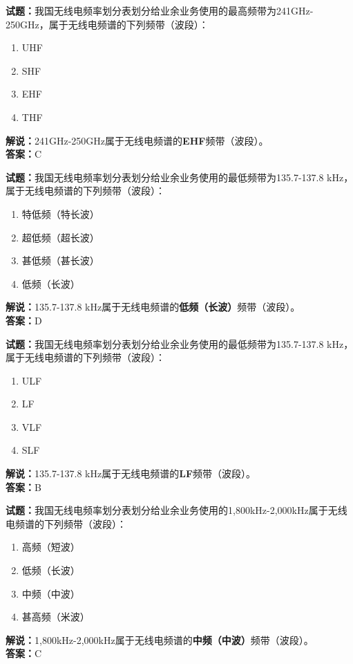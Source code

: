 \documentclass{ctexbook}
\begin{document}
\vspace{1em}

\textbf{试题：}我国无线电频率划分表划分给业余业务使用的最高频带为241\unit{\GHz}-250\unit{\GHz}，属于无线电频谱的下列频带（波段）：
\begin{enumerate}[leftmargin=3em]
  \item UHF
  \item SHF
  \item EHF
  \item THF
\end{enumerate}
\noindent\textbf{解说：}241\unit{\GHz}-250\unit{\GHz}属于无线电频谱的\textbf{EHF}频带（波段）。\\\noindent\textbf{答案：}C

\vspace{1em}

\textbf{试题：}我国无线电频率划分表划分给业余业务使用的最低频带为135.7-137.8 \unit{\kHz}，属于无线电频谱的下列频带（波段）：
\begin{enumerate}[leftmargin=3em]
  \item 特低频（特长波）
  \item 超低频（超长波）
  \item 甚低频（甚长波）
  \item 低频（长波）
\end{enumerate}
\noindent\textbf{解说：}135.7-137.8 \unit{\kHz}属于无线电频谱的\textbf{低频（长波）}频带（波段）。\\\noindent\textbf{答案：}D

\vspace{1em}

\textbf{试题：}我国无线电频率划分表划分给业余业务使用的最低频带为135.7-137.8 \unit{\kHz}，属于无线电频谱的下列频带（波段）：
\begin{enumerate}[leftmargin=3em]
  \item ULF
  \item LF
  \item VLF
  \item SLF
\end{enumerate}
\noindent\textbf{解说：}135.7-137.8 \unit{\kHz}属于无线电频谱的\textbf{LF}频带（波段）。\\\noindent\textbf{答案：}B

\vspace{1em}

\textbf{试题：}我国无线电频率划分表划分给业余业务使用的1,800\unit{\kHz}-2,000\unit{\kHz}属于无线电频谱的下列频带（波段）：
\begin{enumerate}[leftmargin=3em]
  \item 高频（短波）
  \item 低频（长波）
  \item 中频（中波）
  \item 甚高频（米波）
\end{enumerate}
\noindent\textbf{解说：}1,800\unit{\kHz}-2,000\unit{\kHz}属于无线电频谱的\textbf{中频（中波）}频带（波段）。\\\noindent\textbf{答案：}C
\end{document}
